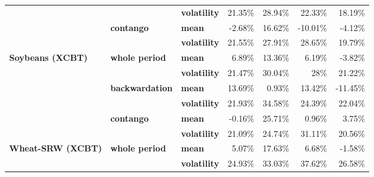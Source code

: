 \documentclass[
  authoryear,
  preprint,
  3p]{elsarticle}
\begin{document}
\begin{longtable}[t]{>{}l>{}l>{}l>{}r>{}r>{}r>{}r}
\textbf{} & \textbf{} & \textbf{volatility} & \textcolor[HTML]{4285f4}{21.35\%} & \textcolor[HTML]{4285f4}{28.94\%} & \textcolor[HTML]{4285f4}{22.33\%} & \textcolor[HTML]{4285f4}{18.19\%}\\
\textbf{} & \textbf{contango} & \textbf{mean} & \textcolor[HTML]{4285f4}{-2.68\%} & \textcolor[HTML]{4285f4}{16.62\%} & \textcolor[HTML]{4285f4}{-10.01\%} & \textcolor[HTML]{4285f4}{-4.12\%}\\
\textbf{} & \textbf{} & \textbf{volatility} & \textcolor[HTML]{4285f4}{21.55\%} & \textcolor[HTML]{4285f4}{27.91\%} & \textcolor[HTML]{4285f4}{28.65\%} & \textcolor[HTML]{4285f4}{19.79\%}\\
\textbf{Soybeans (XCBT)} & \textbf{whole period} & \textbf{mean} & \textcolor[HTML]{4285f4}{6.89\%} & \textcolor[HTML]{4285f4}{13.36\%} & \textcolor[HTML]{4285f4}{6.19\%} & \textcolor[HTML]{4285f4}{-3.82\%}\\
\addlinespace
\textbf{} & \textbf{} & \textbf{volatility} & \textcolor[HTML]{4285f4}{21.47\%} & \textcolor[HTML]{4285f4}{30.04\%} & \textcolor[HTML]{4285f4}{28\%} & \textcolor[HTML]{4285f4}{21.22\%}\\
\textbf{} & \textbf{backwardation} & \textbf{mean} & \textcolor[HTML]{4285f4}{13.69\%} & \textcolor[HTML]{4285f4}{0.93\%} & \textcolor[HTML]{4285f4}{13.42\%} & \textcolor[HTML]{4285f4}{-11.45\%}\\
\textbf{} & \textbf{} & \textbf{volatility} & \textcolor[HTML]{4285f4}{21.93\%} & \textcolor[HTML]{4285f4}{34.58\%} & \textcolor[HTML]{4285f4}{24.39\%} & \textcolor[HTML]{4285f4}{22.04\%}\\
\textbf{} & \textbf{contango} & \textbf{mean} & \textcolor[HTML]{4285f4}{-0.16\%} & \textcolor[HTML]{4285f4}{25.71\%} & \textcolor[HTML]{4285f4}{0.96\%} & \textcolor[HTML]{4285f4}{3.75\%}\\
\textbf{} & \textbf{} & \textbf{volatility} & \textcolor[HTML]{4285f4}{21.09\%} & \textcolor[HTML]{4285f4}{24.74\%} & \textcolor[HTML]{4285f4}{31.11\%} & \textcolor[HTML]{4285f4}{20.56\%}\\
\addlinespace
\textbf{Wheat-SRW (XCBT)} & \textbf{whole period} & \textbf{mean} & \textcolor[HTML]{4285f4}{5.07\%} & \textcolor[HTML]{4285f4}{17.63\%} & \textcolor[HTML]{4285f4}{6.68\%} & \textcolor[HTML]{4285f4}{-1.58\%}\\
\textbf{} & \textbf{} & \textbf{volatility} & \textcolor[HTML]{4285f4}{24.93\%} & \textcolor[HTML]{4285f4}{33.03\%} & \textcolor[HTML]{4285f4}{37.62\%} & \textcolor[HTML]{4285f4}{26.58\%}\\

\end{longtable}
\end{document}
